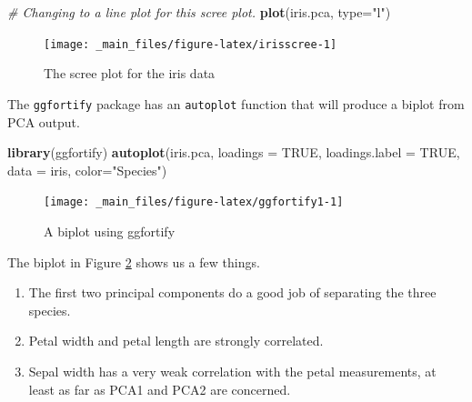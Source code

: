 \documentclass[
]{book}
\newenvironment{Shaded}{\begin{snugshade}}{\end{snugshade}}
\newcommand{\AttributeTok}[1]{\textcolor[rgb]{0.13,0.29,0.53}{#1}}
\newcommand{\CommentTok}[1]{\textcolor[rgb]{0.56,0.35,0.01}{\textit{#1}}}
\newcommand{\ConstantTok}[1]{\textcolor[rgb]{0.56,0.35,0.01}{#1}}
\newcommand{\FunctionTok}[1]{\textcolor[rgb]{0.13,0.29,0.53}{\textbf{#1}}}
\newcommand{\NormalTok}[1]{#1}
\newcommand{\StringTok}[1]{\textcolor[rgb]{0.31,0.60,0.02}{#1}}
\theoremstyle{definition}
\theoremstyle{definition}
\theoremstyle{definition}
\theoremstyle{definition}
\theoremstyle{remark}
\begin{document}
\begin{Shaded}
\begin{Highlighting}[]
\CommentTok{\# Changing to a line plot for this scree plot.}
\FunctionTok{plot}\NormalTok{(iris.pca, }\AttributeTok{type=}\StringTok{"l"}\NormalTok{)}
\end{Highlighting}
\end{Shaded}

\begin{figure}

{\centering \texttt{[image: \_main\_files/figure-latex/irisscree-1]} 

}

\caption{The scree plot for the iris data}\label{fig:irisscree}
\end{figure}

The \texttt{ggfortify} package has an \texttt{autoplot} function that will produce a biplot from PCA output.

\begin{Shaded}
\begin{Highlighting}[]
\FunctionTok{library}\NormalTok{(ggfortify)}
\FunctionTok{autoplot}\NormalTok{(iris.pca, }\AttributeTok{loadings =} \ConstantTok{TRUE}\NormalTok{,}
          \AttributeTok{loadings.label =} \ConstantTok{TRUE}\NormalTok{,}
          \AttributeTok{data =}\NormalTok{ iris,}
          \AttributeTok{color=}\StringTok{"Species"}\NormalTok{)}
\end{Highlighting}
\end{Shaded}

\begin{figure}

{\centering \texttt{[image: \_main\_files/figure-latex/ggfortify1-1]} 

}

\caption{A biplot using ggfortify}\label{fig:ggfortify1}
\end{figure}

The biplot in Figure \ref{fig:ggfortify1} shows us a few things.

\begin{enumerate}
\def\labelenumi{\arabic{enumi}.}
\item
  The first two principal components do a good job of separating the three species.
\item
  Petal width and petal length are strongly correlated.
\item
  Sepal width has a very weak correlation with the petal measurements, at least as far as PCA1 and PCA2 are concerned.
\end{enumerate}
\end{document}
